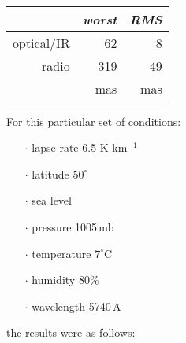 \documentclass[11pt,twoside,nolof]{starlink}
\begin{document}
{\begin{enumerate}
        \vspace{2ex}

        ~~~~~~~~~~
        \begin{tabular}{|r|r|r|} \hline
              & \textit{worst} & \textit{RMS} \\ \hline
              optical/IR & 62 & 8 \\
              radio & 319 & 49 \\ \hline
              & mas & mas \\ \hline
        \end{tabular}

        \vspace{3ex}

        For this particular set of conditions:
        \begin{itemize}
        \item [$\cdot$] lapse rate 6.5 K km$^{-1}$
        \item [$\cdot$] latitude $50^\circ$
        \item [$\cdot$] sea level
        \item [$\cdot$] pressure 1005\,mb
        \item [$\cdot$] temperature $7^\circ$C
        \item [$\cdot$] humidity 80\%
        \item [$\cdot$] wavelength 5740\,\.{A}
        \end{itemize}
        the results were as follows:

        \vspace{2ex}


\end{enumerate}}
\end{document}
